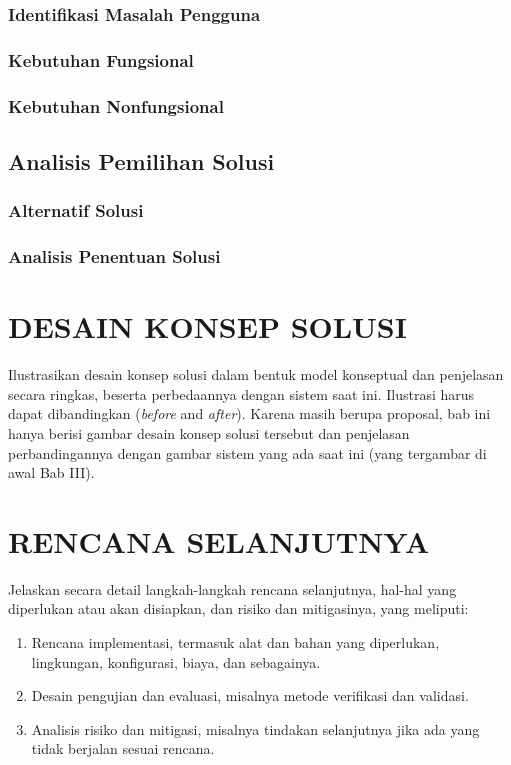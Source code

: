 \documentclass[12pt,a4paper,oneside]{book}
\begin{document}
\subsection{Identifikasi Masalah Pengguna}
\lipsum[5]
\subsection{Kebutuhan Fungsional}
\lipsum[6]
\subsection{Kebutuhan Nonfungsional}
\lipsum[7]

\section{Analisis Pemilihan Solusi}
\subsection{Alternatif Solusi}
\lipsum[8]
\subsection{Analisis Penentuan Solusi}
\lipsum[9]

\chapter{DESAIN KONSEP SOLUSI}
Ilustrasikan desain konsep solusi dalam bentuk model konseptual dan penjelasan secara ringkas, 
beserta perbedaannya dengan sistem saat ini. Ilustrasi harus dapat dibandingkan (\textit{before} and \textit{after}). 
Karena masih berupa proposal, bab ini hanya berisi gambar desain konsep solusi tersebut dan 
penjelasan perbandingannya dengan gambar sistem yang ada saat ini (yang tergambar di awal Bab III).

\chapter{RENCANA SELANJUTNYA}
Jelaskan secara detail langkah-langkah rencana selanjutnya, hal-hal yang diperlukan atau akan disiapkan, dan risiko dan mitigasinya, yang meliputi:
\begin{enumerate}
\item	Rencana implementasi, termasuk alat dan bahan yang diperlukan, lingkungan, konfigurasi, biaya, dan sebagainya.
\item	Desain pengujian dan evaluasi, misalnya metode verifikasi dan validasi.
\item	Analisis risiko dan mitigasi, misalnya tindakan selanjutnya jika ada yang tidak berjalan sesuai rencana.
\end{enumerate}
\end{document}
